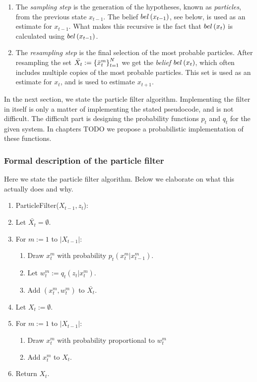 \begin{enumerate}
\item The \emph{sampling step} is the generation of the hypotheses, known as \emph{particles}, from the previous state $x_{t-1}$. The belief $bel\left(x_{t-1}\right)$, see below, is used as an estimate for $x_{t-1}$. What makes this recursive is the fact that $bel\left(x_t\right)$ is calculated using $bel\left(x_{t-1}\right)$.

\item The \emph{resampling step} is the final selection of the most probable particles. After resampling the set $\bar{X_t} := \left\{\bar{x}_{t}^{m}\right\}_{t=1}^{N}$ we get the \emph{belief} $bel\left(x_t\right)$, which often includes multiple copies of the most probable particles. This set is used as an estimate for $x_t$, and is used to estimate $x_{t+1}$.
\end{enumerate}

In the next section, we state the particle filter algorithm. Implementing the filter in itself is only a matter of implementing the stated pseudocode, and is not difficult. The difficult part is designing the probability functions $p_t$ and $q_t$ for the given system. In chapters TODO we propose a probabilistic implementation of these functions.


\subsubsection{Formal description of the particle filter}
Here we state the particle filter algorithm. Below we elaborate on what this actually does and why.
\begin{enumerate}
\item ParticleFilter($X_{t-1}, z_t$):
\item Let $\bar{X_t} = \emptyset$.
\item For $m:=1$ to $\left|X_{t-1}\right|$:
  \begin{enumerate}
  \item Draw $x_t^m$ with probability $p_t\left(x_t^m | x_{t-1}^m\right)$.
  \item Let $w_t^m := q_t\left(z_t | x_t^m\right)$.
  \item Add $(x_t^m, w_t^m)$ to $\bar{X_t}$.
  \end{enumerate}
\item Let $X_t := \emptyset$.
\item For $m:=1$ to $\left|X_{t-1}\right|$:
  \begin{enumerate}
    \item Draw $x_t^m$ with probability proportional to $w_t^m$
    \item Add $x_t^m$ to $X_t$.
  \end{enumerate}
\item Return $X_t$.
\end{enumerate}


